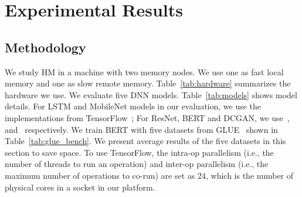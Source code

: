 \section{Experimental Results}
\subsection{Methodology}






We study HM in a machine with two memory nodes. We use one as fast local memory and one as slow remote memory. Table~\ref{tab:hardware} summarizes the hardware we use. We evaluate five DNN models.
Table~\ref{tab:models} shows model details. For %
LSTM and MobileNet models in our evaluation, we use the implementations from TensorFlow~\cite{tf_models}; For ResNet, BERT and DCGAN, we use~\cite{resnet_32}, ~\cite{bert_github} and~\cite{dcgan} respectively. 
We train BERT with five datasets from GLUE~\cite{wang-etal-2018-glue}  shown in Table~\ref{tab:glue_bench}. \textcolor{check}{We present average results of the five datasets in this section to save space}. To use TensorFlow, the intra-op parallelism (i.e., the number of threads to run an operation) and inter-op parallelism (i.e., the maximum number of operations to co-run) are set as 24, which is the number of physical cores in a socket in our platform. 



